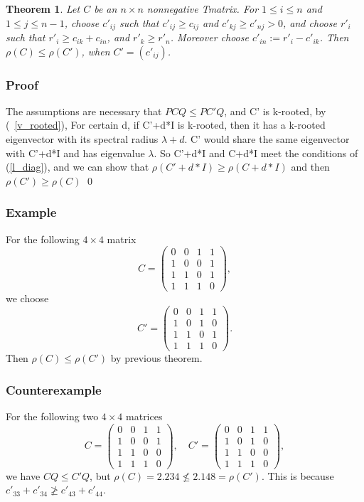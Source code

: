 \documentclass{beamer}
\theoremstyle{plain}
\newtheorem{thm}{Theorem}[section]
\theoremstyle{definition}
\begin{document}
\begin{frame}

\begin{thm}
    Let $C$ be an $n\times n$ nonnegative Tmatrix. For $1\leq i \leq n$ and $1\leq j\leq n-1$, choose $c'_{ij}$
    such that $c'_{ij}\geq c_{ij}$ and $c'_{kj}\geq c'_{nj}>0$, and choose $r'_i$ such that $r'_i\geq c_{ik}+c_{in}$, and
    $r'_k \geq r'_n$. Moreover choose $c'_{in}:=r'_i-c'_{ik}$. Then $\rho(C)\leq \rho(C')$, when $C'=(c'_{ij})$.
\end{thm}

\end{frame}

\begin{frame}
    \frametitle{ Proof}

The assumptions are necessary that $PCQ \leq PC'Q$, and C' is k-rooted, by (~\ref{v_rooted}), For certain d, if C'+d*I is k-rooted, then it has a k-rooted eigenvector with its spectral radius $\lambda + d$. C' would share the same eigenvector with C'+d*I and has eigenvalue $\lambda$. So C'+d*I and C+d*I meet the conditions of (\ref{l_diag}), and we can show that $\rho(C' + d*I) \geq \rho(C +d*I)$ and then $\rho(C') \geq \rho(C)$  \qed    

\end{frame}

\begin{frame}
    \frametitle{ Example}
    For the following $4\times 4$ matrix
    $$C=\begin{pmatrix}
    0 & 0 & 1 & 1\\
    1 & 0 & 0 & 1\\
    1 & 1 & 0 & 1\\
    1 & 1 & 1 & 0
    \end{pmatrix},$$
    we choose
    $$C'=\begin{pmatrix}
    0 & 0 & 1 & 1\\
    1 & 0 & 1 &  0\\
    1 & 1 & 0 & 1\\
    1 & 1 & 1 & 0
    \end{pmatrix}.$$
    Then
    $\rho(C)\leq \rho(C')$ by previous theorem.
\end{frame}

\begin{frame}
    \frametitle{Counterexample}
    For the following two $4\times 4$ matrices
    $$C=\begin{pmatrix}
    0 & 0 & 1 & 1\\
    1 & 0 & 0 & 1\\
    1 & 1 & 0 & 0\\
    1 & 1 & 1 & 0
    \end{pmatrix},\quad C'=\begin{pmatrix}
    0 & 0 & 1 & 1\\
    1 & 0 & 1 &  0\\
    1 & 1 & 0 & 0\\
    1 & 1 & 1 & 0
    \end{pmatrix},$$ 
    we have $CQ\leq C'Q$, but 
    $\rho(C)=2.234\not\leq 2.148= \rho(C')$. 
    This is because $c'_{33}+c'_{34}\not\geq c'_{43}+c'_{44}$. 
\end{frame}
\end{document}
